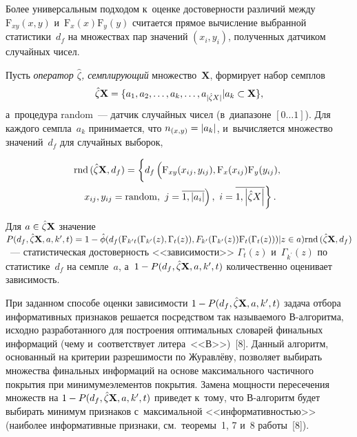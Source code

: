 \begin{multicols}{2}
     Более универсальным подходом к~оценке достоверности различий 
между $\mathrm{F}_{{xy}}(x,y)$ и~$\mathrm{F}_{{x}}(x) 
\mathrm{F}_{{y}}(y)$ считается прямое вычисление выбранной 
статистики~$d_f$ на множествах пар значений $(x_i, y_i)$, полученных 
датчиком случайных чисел. 
     
     Пусть \textit{оператор $\hat{\zeta}$, семплирующий} 
множество~$\mathbf{X}$, формирует набор семплов 
$$
\hat{\zeta}\mathbf{X}\hm= \{a_1, a_2, \ldots , a_k, \ldots , 
a_{\vert\hat{\zeta}X\vert}\vert a_k\hm\subset \mathbf{X}\},
$$
 а~процедура 
random~--- датчик случайных чисел (в~диапазоне $[0\ldots 1]$). Для каждого 
семпла~$a_k$ принимается, что ${n}_{({x,y})} \hm= \vert 
a_k\vert$, и~вычисляется множество значений~$d_f$ для случайных 
выборок, 

\noindent
\begin{multline*}
\mathrm{rnd}\,(\hat{\zeta}\mathbf{X}, d_f)= \left\{ 
\vphantom{i=\overline{1,\left\vert \hat{\zeta} X\right\vert }}
d_f\left(
\vphantom{\overline{1, \vert a_i\vert }}
\mathrm{F}_{{xy}}(x_{ij}, y_{ij}), 
\mathrm{F}_{{x}}(x_{ij}) \mathrm{F}_{{y}}(y_{ij}),\right.\right.\\
\left.\left. x_{ij}, 
y_{ij}= \mathrm{random},\  j=\overline{1, \vert a_i\vert }\right),\ i=\overline{1,\left\vert \hat{\zeta} X\right\vert }\right\}.
\end{multline*}

 Для $a\hm\in \hat{\zeta} \mathbf{X}$ значение 
${P}(d_f, \hat{\zeta}\mathbf{X}, a, k^\prime, t)\hm= 1\hm-
\hat{\phi}(d_f(\mathrm{F}_{k^\prime t}(\Gamma_{k^\prime}(z), \Gamma_t(z)), F_{k^\prime}(\Gamma_{k^\prime}(z)) 
\mathrm{F}_t(\Gamma_t(z)))\vert z\hm\in a) \mathrm{rnd}\,(\hat{\zeta}\mathbf{X}, d_f)$~--- статистическая достоверность 
<<зависимости>> $\Gamma_t(z)$ и~$\Gamma_{k^\prime}(z)$ по 
статистике~$d_f$ на семпле~$a$, а~$1\hm- P(d_f, 
\hat{\zeta}\mathbf{X}, a, k^\prime, t)$ количественно оценивает зависимость.
    

При заданном способе оценки зависимости $1\hm- P(d_f, 
\hat{\zeta}\mathbf{X}, a, k^\prime, t)$ задача отбора информативных 
признаков решается посредством так называемого\linebreak  
В-ал\-го\-рит\-ма, исходно разработанного для построения оптимальных 
словарей финальных ин\-фор\-маций (чему и~соответствует литера~<<В>>)~[8]. 
\mbox{Данный} алгоритм, основанный на критерии раз\-ре\-ши\-мости по Журавлёву, 
позволяет выбирать множества финальных информаций на основе 
максимального час\-тич\-но\-го покрытия при минимуме\linebreak элементов покрытия. 
Замена мощности пересечения множеств на $1\hm- P(d_f, 
\hat{\zeta}\mathbf{X}, a, k^\prime, t)$ приведет к~тому, что  
В-ал\-го\-ритм будет выбирать минимум признаков с~максимальной 
<<информативностью>>\linebreak (наиболее информативные признаки, см.\ 
теоремы~1, 7  и~8 работы~[8]).


\end{multicols}
